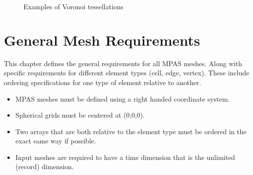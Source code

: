 \documentclass[11pt]{report}
\begin{document}
\begin{figure}[htb]
\begin{center}
\caption{Examples of Voronoi tessellations}
\label{fig:planar_spherical}
\end{center}
\end{figure}


\chapter{General Mesh Requirements}

This chapter defines the general requirements for all MPAS meshes. Along with specific requirements for different element types (cell, edge, vertex). These include ordering specifications for one type of element relative to another.

\begin{itemize}
	\item MPAS meshes must be defined using a right handed coordinate system.
	\item Spherical grids must be centered at (0,0,0).
	\item Two arrays that are both relative to the element type must be ordered in the exact same way if possible.
	\item Input meshes are required to have a time dimension that is the unlimited (record) dimension.
\end{itemize}
\end{document}
